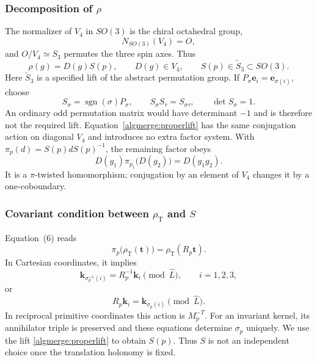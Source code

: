 \subsubsection{Decomposition of \texorpdfstring{$\rho$}{rho}}

The normalizer of $V_4$ in $SO(3)$ is the chiral octahedral group,
\begin{equation}
 N_{SO(3)}(V_4)=O,
 \tag{29}\label{algmerge:kleinnormalizer}
\end{equation}
and $O/V_4\simeq S_3$ permutes the three spin axes. Thus
\begin{equation}
 \rho(g)=D(g)S(p),\qquad D(g)\in V_4,\qquad S(p)\in\widetilde S_3\subset SO(3).
 \tag{30}\label{algmerge:kleindecomposition}
\end{equation}
Here $\widetilde S_3$ is a specified lift of the abstract permutation
group. If $P_\sigma\bm e_i=\bm e_{\sigma(i)}$, choose
\begin{equation}
 S_\sigma=\operatorname{sgn}(\sigma)P_\sigma,
 \qquad S_\sigma S_\tau=S_{\sigma\tau},\qquad\det S_\sigma=1.
 \tag{30a}\label{algmerge:properlift}
\end{equation}
An ordinary odd permutation matrix would have determinant $-1$
and is therefore not the required lift. Equation~\eqref{algmerge:properlift}
has the same conjugation action on diagonal $V_4$ and introduces
no extra factor system. With $\pi_p(d)=S(p)dS(p)^{-1}$, the
remaining factor obeys
\begin{equation}
 D(g_1)\pi_{p_1}\bigl(D(g_2)\bigr)=D(g_1g_2).
 \tag{31}\label{algmerge:twistedhom}
\end{equation}
It is a $\pi$-twisted homomorphism; conjugation by an element of
$V_4$ changes it by a one-coboundary.

\subsubsection{Covariant condition between \texorpdfstring{$\rho_{\mathrm T}$}{rho T} and \texorpdfstring{$S$}{S}}

Equation~(6) reads
\begin{equation}
 \pi_p\bigl(\rho_{\mathrm T}(\bm t)\bigr)=\rho_{\mathrm T}(R_p\bm t).
 \tag{32}\label{algmerge:kleincovariance}
\end{equation}
In Cartesian coordinates, it implies
\begin{equation}
 \bm k_{\sigma_p^{-1}(i)}=R_p^{-1}\bm k_i\pmod{\widehat L},
 \qquad i=1,2,3,
 \tag{33}\label{algmerge:permutationinverse}
\end{equation}
or
\begin{equation}
 R_p\bm k_i=\bm k_{\sigma_p(i)}\pmod{\widehat L}.
 \tag{34}\label{algmerge:permutation}
\end{equation}
In reciprocal primitive coordinates this action is $M_p^{-T}$.
For an invariant kernel, its annihilator triple is preserved and
these equations determine $\sigma_p$ uniquely. We use the lift
\eqref{algmerge:properlift} to obtain $S(p)$. Thus $S$ is not an
independent choice once the translation holonomy is fixed.

